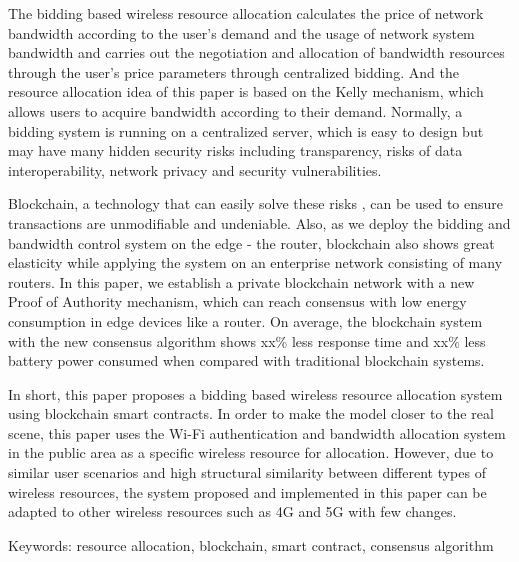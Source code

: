 \begin{enabstract}

The bidding based wireless resource allocation calculates the price of network bandwidth according to the user's demand and the usage of network system bandwidth and carries out the negotiation and allocation of bandwidth resources through the user's price parameters through centralized bidding. And the resource allocation idea of this paper is based on the Kelly mechanism\cite{yang_price_2013}, which allows users to acquire bandwidth according to their demand. Normally, a bidding system is running on a centralized server, which is easy to design but may have many hidden security risks including transparency, risks of data interoperability, network privacy and security vulnerabilities.

Blockchain, a technology that can easily solve these risks , can be used to ensure transactions are unmodifiable and undeniable. Also, as we deploy the bidding and bandwidth control system on the edge - the router, blockchain also shows great elasticity while applying the system on an enterprise network consisting of many routers. In this paper, we establish a private blockchain network with a new Proof of Authority mechanism, which can reach consensus with low energy consumption in edge devices like a router. On average, the blockchain system with the new consensus algorithm shows xx\% less response time and xx\% less battery power consumed when compared with traditional blockchain systems.

In short, this paper proposes a bidding based wireless resource allocation system using blockchain smart contracts. In order to make the model closer to the real scene, this paper uses the Wi-Fi authentication and bandwidth allocation system in the public area as a specific wireless resource for allocation. However, due to similar user scenarios and high structural similarity between different types of wireless resources, the system proposed and implemented in this paper can be adapted to other wireless resources such as 4G and 5G with few changes.

Keywords: resource allocation, blockchain, smart contract, consensus algorithm


\end{enabstract}
